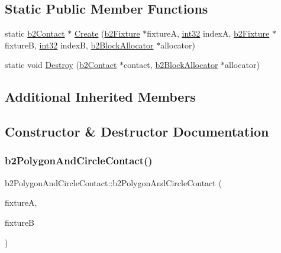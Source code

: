 \subsection*{Static Public Member Functions}
\begin{DoxyCompactItemize}
\item 
static \mbox{\hyperlink{classb2_contact}{b2\+Contact}} $\ast$ \mbox{\hyperlink{classb2_polygon_and_circle_contact_a0b83e092a7d14f9cdd919fa15ef6058f}{Create}} (\mbox{\hyperlink{classb2_fixture}{b2\+Fixture}} $\ast$fixtureA, \mbox{\hyperlink{b2_settings_8h_a43d43196463bde49cb067f5c20ab8481}{int32}} indexA, \mbox{\hyperlink{classb2_fixture}{b2\+Fixture}} $\ast$fixtureB, \mbox{\hyperlink{b2_settings_8h_a43d43196463bde49cb067f5c20ab8481}{int32}} indexB, \mbox{\hyperlink{classb2_block_allocator}{b2\+Block\+Allocator}} $\ast$allocator)
\item 
static void \mbox{\hyperlink{classb2_polygon_and_circle_contact_a04e9a3fcdcf52821fb90b8206b8bb2f0}{Destroy}} (\mbox{\hyperlink{classb2_contact}{b2\+Contact}} $\ast$contact, \mbox{\hyperlink{classb2_block_allocator}{b2\+Block\+Allocator}} $\ast$allocator)
\end{DoxyCompactItemize}
\subsection*{Additional Inherited Members}


\subsection{Constructor \& Destructor Documentation}
\mbox{\label{classb2_polygon_and_circle_contact_a38158da229eee22253c1f64df1982e40}} 
\subsubsection{\texorpdfstring{b2PolygonAndCircleContact()}{b2PolygonAndCircleContact()}}
{\footnotesize\ttfamily b2\+Polygon\+And\+Circle\+Contact\+::b2\+Polygon\+And\+Circle\+Contact (\begin{DoxyParamCaption}\item[{\mbox{\hyperlink{classb2_fixture}{b2\+Fixture}} $\ast$}]{fixtureA,  }\item[{\mbox{\hyperlink{classb2_fixture}{b2\+Fixture}} $\ast$}]{fixtureB }\end{DoxyParamCaption})}

